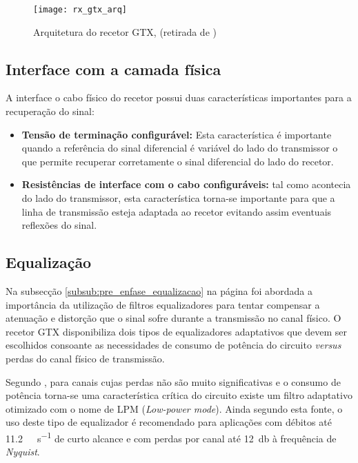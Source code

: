 \begin{figure}[h!]
	\begin{center}
		\leavevmode
		\texttt{[image: rx\_gtx\_arq]}
		\centering
		\caption[Arquitetura do recetor GTX]{Arquitetura do recetor GTX, (retirada de \cite{R011})}
		\label{fig:gtx_rx_arq}
	\end{center}
\end{figure}
	

\subsection{Interface com a camada física}

A interface o cabo físico do recetor possui duas características importantes para a recuperação do sinal:
\begin{itemize}
	\item \textbf{Tensão de terminação configurável:} Esta característica é importante quando a referência do sinal diferencial é variável do lado do transmissor o que permite recuperar corretamente o sinal diferencial do lado do recetor.
	
	\item \textbf{Resistências de interface com o cabo configuráveis:} tal como acontecia do lado do transmissor, esta característica torna-se importante para que a linha de transmissão esteja adaptada ao recetor evitando assim eventuais reflexões do sinal.
\end{itemize}


\subsection{Equalização} \label{subsub:rx_equalização}

Na subsecção \ref{subsub:pre_enfase_equalizacao} na página \pageref{subsub:pre_enfase_equalizacao} foi abordada a importância da utilização de filtros equalizadores para tentar compensar a atenuação e distorção que o sinal sofre durante a transmissão no canal físico. O recetor GTX disponibiliza dois tipos de equalizadores adaptativos que devem ser escolhidos consoante as necessidades de consumo de potência do circuito \textit{versus} perdas do canal físico de transmissão.

Segundo \cite{R011}, para canais cujas perdas não são muito significativas e o consumo de potência torna-se uma característica crítica do circuito existe um filtro adaptativo otimizado com o nome de LPM (\textit{Low-power mode}). Ainda segundo esta fonte, o uso deste tipo de equalizador é recomendado para aplicações com débitos até \SI{11.2}{\giga\bit\per\second} de curto alcance e com perdas por canal até \SI{12}{\decibel} à frequência de \textit{Nyquist}.


